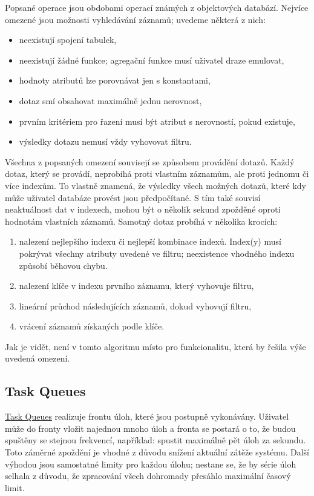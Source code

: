 Popsané operace jsou obdobami operací známých z objektových databází.
Nejvíce omezené jsou možnosti vyhledávání záznamů; uvedeme některá z nich:
\begin{itemize}
	\item neexistují spojení tabulek,
	\item neexistují žádné funkce; agregační funkce musí uživatel draze emulovat,
	\item hodnoty atributů lze porovnávat jen s konstantami,
	\item dotaz smí obsahovat maximálně jednu nerovnost,
	\item prvním kritériem pro řazení musí být atribut s nerovností, pokud existuje,
	\item výsledky dotazu nemusí vždy vyhovovat filtru.
\end{itemize}

Všechna z popsaných omezení souvisejí se způsobem provádění dotazů.
Každý dotaz, který se provádí, neprobíhá proti vlastním záznamům, ale proti jednomu či více indexům.
To vlastně znamená, že výsledky všech možných dotazů, které kdy může uživatel databáze provést jsou předpočítané.
S tím také souvisí neaktuálnost dat v indexech, mohou být o několik sekund zpožděné oproti hodnotám vlastních záznamů.
Samotný dotaz probíhá v několika krocích:
\begin{enumerate}
	\item nalezení nejlepšího indexu či nejlepší kombinace indexů.
		Index(y) musí pokrývat všechny atributy uvedené ve filtru; neexistence vhodného indexu způsobí běhovou chybu.
	\item nalezení klíče v indexu prvního záznamu, který vyhovuje filtru,
	\item lineární průchod následujících záznamů, dokud vyhovují filtru,
	\item vrácení záznamů získaných podle klíče.
\end{enumerate}

Jak je vidět, není v tomto algoritmu místo pro funkcionalitu, která by řešila výše uvedená omezení.

\subsection{Task Queues}

\href{https://developers.google.com/appengine/docs/java/taskqueue/}{Task Queues} realizuje frontu úloh, které jsou postupně vykonávány.
Uživatel může do fronty vložit najednou mnoho úloh a fronta se postará o to, že budou spuštěny se stejnou frekvencí, například: spustit maximálně pět úloh za sekundu.
Toto záměrné zpoždění je vhodné z důvodu snížení aktuální zátěže systému.
Další výhodou jsou samostatné limity pro každou úlohu; nestane se, že by série úloh selhala z důvodu, že zpracování všech dohromady přesáhlo maximální časový limit.

